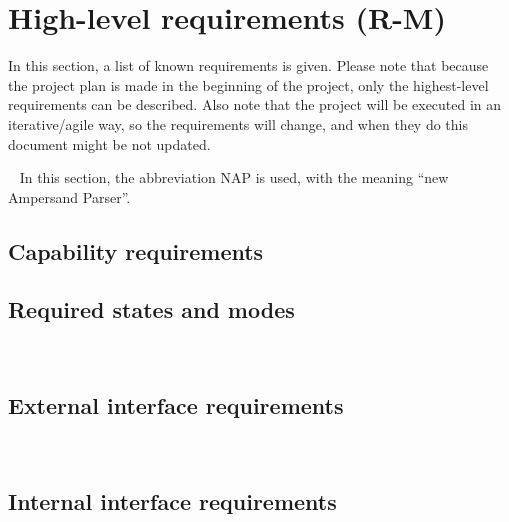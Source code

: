 \section{High-level requirements (R-M)}
\label{sec:requirements}
In this section, a list of known requirements is given.
Please note that because the project plan is made in the beginning of the project, only the highest-level requirements can be described.
Also note that the project will be executed in an iterative/agile way, so the requirements will change, and when they do this document might be not updated.

~\newline\noindent
In this section, the abbreviation NAP is used, with the meaning ``new Ampersand Parser''.
%

\subsection{Capability requirements}

\subsection{Required states and modes}
\\


\subsection{External interface requirements}
\\

%

\subsection{Internal interface requirements}

